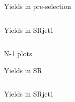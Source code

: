 \documentclass[mathserif,serif]{beamer}
\begin{document}
\begin{frame}{Yields in pre-selection}
\begin{table}[htbp]
\centering
\tiny

\begin{columns}

\begin{column}{0.5\textwidth}
\caption{\tiny Yields in SRjet1}
\end{column}

\begin{column}{0.5\textwidth}
\caption{\tiny Yields in SRjet23}
\end{column}

\end{columns}
\end{table}
\end{frame}



\begin{frame}
\begin{center}
\huge
N-1 plots
\end{center}
\end{frame}

\begin{frame}{Yields in SR}
\begin{table}[htbp]
\centering
\tiny

\begin{columns}

\begin{column}{0.5\textwidth}
\caption{\tiny Yields in SRjet1}
\end{column}

\begin{column}{0.5\textwidth}
\caption{\tiny Yields in SRjet23}
\end{column}

\end{columns}
\end{table}
\end{frame}


\end{document}
